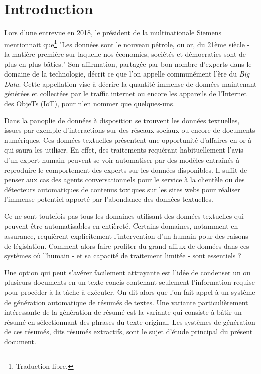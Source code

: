 \chapter{Introduction}
\label{chap:introduction}

Lors d'une entrevue en 2018, le président de la multinationale Siemens 
mentionnait que\footnote{Traduction libre.} "Les données sont le nouveau pétrole, ou or,
du 21ème siècle - la matière première sur laquelle nos économies,
sociétés et démocraties sont de plus en plus bâties."
Son affirmation, partagée par bon nombre d'experts dans le domaine de la
technologie, décrit ce que l'on appelle communément l'ère du \textit{Big Data}.
Cette appellation vise à décrire la quantité immense de données maintenant 
générées et collectées par le traffic internet ou encore les appareils de 
l'Internet des ObjeTs (IoT), pour n'en nommer que quelques-uns.

Dans la panoplie de données à disposition se trouvent les données textuelles, 
issues par exemple d'interactions sur des réseaux sociaux ou encore de documents 
numériques.
Ces données textuelles présentent une opportunité d'affaires en or à qui saura
les utiliser.
En effet, des traitements requérant habituellement l'avis d'un expert humain 
peuvent se voir automatiser par des modèles entraînés à reproduire le comportement
des experts sur les données disponibles.
Il suffit de penser aux cas des agents conversationnels pour le service à 
la clientèle ou des détecteurs automatiques de contenus toxiques 
sur les sites webs pour réaliser l'immense potentiel apporté par l'abondance
des données textuelles.

Ce ne sont toutefois pas tous les domaines utilisant des données textuelles 
qui peuvent être automatisables en entièreté.
Certains domaines, notamment en assurance, requièrent explicitement l'intervention 
d'un humain pour des raisons de législation.
Comment alors faire profiter du grand afflux de données dans ces systèmes où l'humain - et
sa capacité de traitement limitée - sont essentiels ?

Une option qui peut s'avérer facilement attrayante est l'idée de condenser un ou plusieurs
documents en un texte concis contenant seulement l'information requise pour procéder à la
tâche à exécuter.
On dit alors que l'on fait appel à un système de génération automatique de résumés de textes.
Une variante particulièrement intéressante de la génération de résumé est la variante 
qui consiste à bâtir un résumé en sélectionnant des phrases du texte original.
Les systèmes de génération de ces résumés, dits résumés extractifs, 
sont le sujet d'étude principal du présent document.

